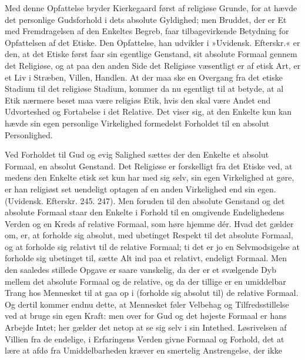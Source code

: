 \documentclass[12pt,a4paper,openany]{book}
\newcommand{\opage}[1]{\marginnote{\footnotesize\textit{[#1]}}}
\begin{document}
Med denne Opfattelse bryder Kierkegaard først af religiøse
Grunde, for at hævde det personlige Gudsforhold i dets
absolute Gyldighed; men Bruddet, der er Et med Fremdragelsen
af den Enkeltes Begreb, faar tilbagevirkende
Betydning for Opfattelsen af det Etiske. Den Opfattelse,
han udvikler i »Uvidensk. Efterskr.« er den, at det Etiske
først faar sin egentlige Genstand, sit absolute Formaal
gennem det Religiøse, og at paa den anden Side det
Religiøse væsentligt er af etisk Art, er et Liv i Stræben,
\opage{111}Villen, Handlen. At der maa ske en Overgang fra det
etiske Stadium til det religiøse Stadium, kommer da nu
egentligt til at betyde, at al Etik nærmere beset maa
være religiøs Etik, hvis den skal være Andet end Udvorteshed
og Fortabelse i det Relative. Det viser sig,
at den Enkelte kun kan hævde sin egen personlige Virkelighed
formedelst Forholdet til en absolut Personlighed.

Ved Forholdet til Gud og evig Salighed sættes der
den Enkelte et absolut Formaal, en absolut Genstand.
Det Religiøse er forskelligt fra det Etiske ved, at medens
den Enkelte etisk set kun har med sig selv, sin egen
Virkelighed at gøre, er han religiøst set uendeligt optagen
af en anden Virkelighed end sin egen. (Uvidensk.
Efterskr. 245. 247). Men foruden til den absolute Genstand
og det absolute Formaal staar den Enkelte i Forhold
til en omgivende Endelighedens Verden og en Kreds
af relative Formaal, som høre hjemme dér. Hvad det
gælder om, er, at forholde sig absolut, med ubetinget
Respekt til det absolute Formaal, og at forholde sig relativt
til de relative Formaal; ti det er jo en Selvmodsigelse
at forholde sig ubetinget til, sætte Alt ind paa et relativt,
endeligt Formaal. Men den saaledes stillede Opgave er
saare vanskelig, da der er et svælgende Dyb mellem det
absolute Formaal og de relative, og da der tillige er en
umiddelbar Trang hos Mennesket til at gaa op i (forholde
sig absolut til) de relative Formaal. Og dertil
kommer endnu dette, at Mennesket føler Velbehag og
Tilfredsstillelse ved at bruge sin egen Kraft: men over
for Gud og det højeste Formaal er hans Arbejde Intet;
her gælder det netop at se sig selv i sin Intethed. Løsrivelsen
af Villien fra de endelige, i Erfaringens Verden
givne Formaal og Forhold, det at lære at afdø fra Umiddelbarheden
kræver en smertelig Anstrengelse, der ikke
\end{document}
